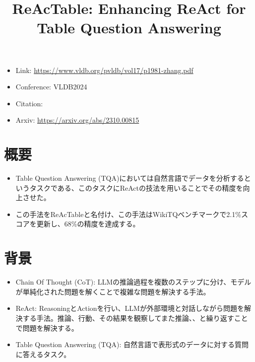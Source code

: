 \documentclass[dvipdfmx,uplatex]{jsarticle}
\title{ReAcTable: Enhancing ReAct for Table Question Answering}
\author{\empty}
\date{\empty}
\theoremstyle{remark}
\newenvironment{simplebox}{
    \begin{tcolorbox}[
        fonttitle=\bfseries,
    ]
}{
    \end{tcolorbox}
}
\begin{document}
\maketitle

\begin{itemize}
    \item Link: \url{https://www.vldb.org/pvldb/vol17/p1981-zhang.pdf}
    \item Conference: VLDB2024
    \item Citation: \cite{ReAcTable}
    \item Arxiv: \url{https://arxiv.org/abs/2310.00815}
\end{itemize}

\section{概要}
\begin{simplebox}
\begin{itemize}
    \item Table Question Answering (TQA)においては自然言語でデータを分析するというタスクである、このタスクにReActの技法を用いることでその精度を向上させた。
    \item この手法をReAcTableと名付け、この手法はWikiTQベンチマークで2.1\%スコアを更新し、68\%の精度を達成する。
\end{itemize}
\end{simplebox}

\section{背景}
\begin{simplebox}
\begin{itemize}
    \item Chain Of Thought (CoT): LLMの推論過程を複数のステップに分け、モデルが単純化された問題を解くことで複雑な問題を解決する手法。
    \item ReAct: ReasoningとActionを行い、LLMが外部環境と対話しながら問題を解決する手法。推論、行動、その結果を観察してまた推論、、と繰り返すことで問題を解決する。
    \item Table Question Answering (TQA): 自然言語で表形式のデータに対する質問に答えるタスク。
\end{itemize}
\end{simplebox}
\end{document}
